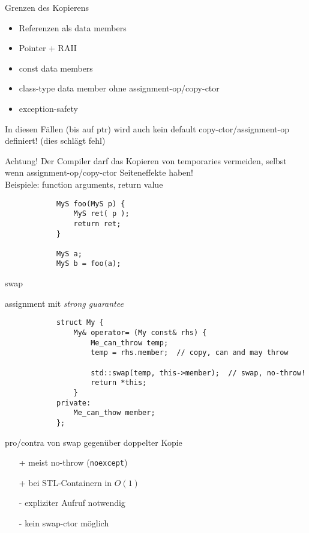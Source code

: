 \begin{frame}{Grenzen des Kopierens}
	\begin{itemize}
		\item Referenzen als data members
		\item Pointer + RAII
		\item const data members
		\item class-type data member ohne assignment-op/copy-ctor
		\item exception-safety
	\end{itemize}
	
	In diesen Fällen (bis auf ptr) wird auch kein default copy-ctor/assignment-op definiert! (dies schlägt fehl)
		
	\begin{block}{Achtung!}
		Der Compiler darf das Kopieren von temporaries vermeiden, selbst wenn assignment-op/copy-ctor Seiteneffekte haben!\\
		Beispiele: function arguments, return value
	
		\begin{lstlisting}
			MyS foo(MyS p) {
			    MyS ret( p );
			    return ret;
			}
		
			MyS a;
			MyS b = foo(a);
		\end{lstlisting}
	\end{block}
\end{frame}

\begin{frame}[fragile]{swap}
	\begin{block}{ assignment mit \emph{strong guarantee} }
		\begin{lstlisting}
			struct My {
			    My& operator= (My const& rhs) {
			        Me_can_throw temp;
			        temp = rhs.member;	// copy, can and may throw
					
			        std::swap(temp, this->member);	// swap, no-throw!
			        return *this;
			    }
			private:
			    Me_can_thow member;
			};
		\end{lstlisting}
	\end{block}
	
	\pause
	
	\begin{block}{pro/contra von swap gegenüber doppelter Kopie}
		\begin{itemize}
			\item[+] meist no-throw (\texttt{noexcept})
			\item[+] bei STL-Containern in $O(1)$
			\item[-] expliziter Aufruf notwendig
			\item[-] kein swap-ctor möglich
		\end{itemize}
	\end{block}
\end{frame}

